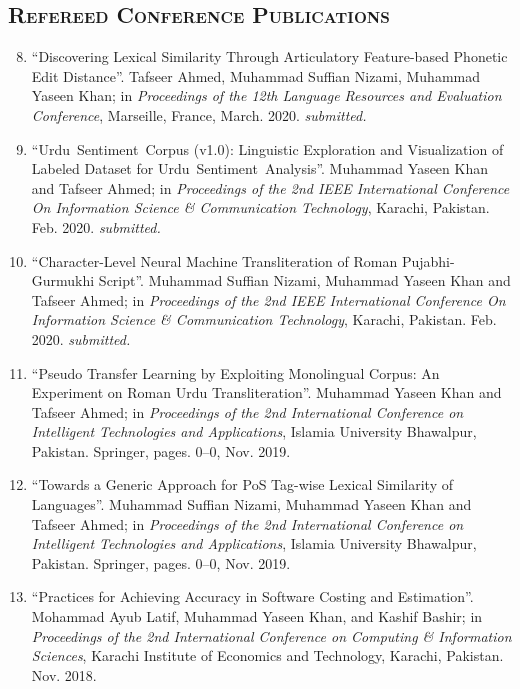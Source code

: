 \documentclass[a4paper, 10pt]{article}
\begin{document}
\subsection*{\normalfont\textsc{\bf Refereed Conference Publications}}
\begin{enumerate}
\setcounter{enumi}{7}
\itemsep-4pt 
\item ``Discovering Lexical Similarity Through Articulatory Feature-based Phonetic Edit Distance''. Tafseer Ahmed, Muhammad Suffian Nizami, Muhammad Yaseen Khan; in \emph{Proceedings of the 12th Language Resources and Evaluation Conference}, Marseille, France, March. 2020. \emph{\small submitted.}

\item ``Urdu~Sentiment~Corpus (v1.0): Linguistic Exploration and Visualization of Labeled Dataset for Urdu~Sentiment~Analysis''. Muhammad Yaseen Khan and Tafseer Ahmed; in \emph{Proceedings of the 2nd IEEE International Conference On Information Science \& Communication Technology}, Karachi, Pakistan. Feb. 2020. \emph{\small submitted.}

\item ``Character-Level Neural Machine Transliteration of Roman Pujabhi-Gurmukhi Script''. Muhammad Suffian Nizami, Muhammad Yaseen Khan and Tafseer Ahmed; in \emph{Proceedings of the 2nd IEEE International Conference On Information Science \& Communication Technology}, Karachi, Pakistan. Feb. 2020. \emph{\small submitted.}

 \item ``Pseudo Transfer Learning by Exploiting Monolingual Corpus: An Experiment on Roman Urdu Transliteration''. Muhammad Yaseen Khan and Tafseer Ahmed; in \emph{Proceedings of the 2nd International Conference on Intelligent Technologies and Applications}, Islamia University Bhawalpur, Pakistan. Springer,  pages. 0--0, Nov. 2019.
 
  \item ``Towards a Generic Approach for PoS Tag-wise Lexical Similarity of Languages''. Muhammad Suffian Nizami, Muhammad Yaseen Khan and Tafseer Ahmed; in \emph{Proceedings of the 2nd International Conference on Intelligent Technologies and Applications}, Islamia University Bhawalpur, Pakistan. Springer,  pages. 0--0, Nov. 2019.
  
  \item ``Practices for Achieving Accuracy in Software Costing and Estimation''. Mohammad Ayub Latif, Muhammad Yaseen Khan, and Kashif Bashir; in \emph{Proceedings of the 2nd International Conference on Computing \& Information Sciences}, Karachi Institute of Economics and Technology, Karachi, Pakistan. Nov. 2018.
  

\end{enumerate}
\end{document}
